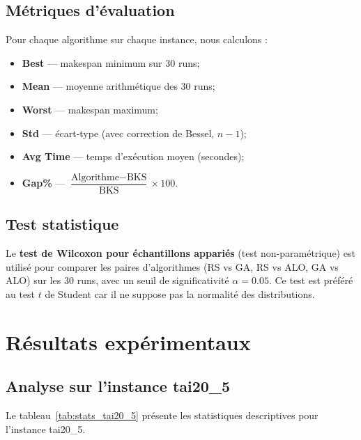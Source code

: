 \documentclass[12pt,a4paper,twoside]{report}
\begin{document}
\section{Métriques d'évaluation}

Pour chaque algorithme sur chaque instance, nous calculons :
\begin{itemize}
    \item \textbf{Best} --- makespan minimum sur 30 runs;
    \item \textbf{Mean} --- moyenne arithmétique des 30 runs;
    \item \textbf{Worst} --- makespan maximum;
    \item \textbf{Std} --- écart-type (avec correction de Bessel, $n-1$);
    \item \textbf{Avg Time} --- temps d'exécution moyen (secondes);
    \item \textbf{Gap\%} --- $\dfrac{\text{Algorithme} - \text{BKS}}{\text{BKS}} \times 100$.
\end{itemize}

\section{Test statistique}

Le \textbf{test de Wilcoxon pour échantillons appariés} (test non-paramétrique) est utilisé pour comparer les paires d'algorithmes (RS vs GA, RS vs ALO, GA vs ALO) sur les 30 runs, avec un seuil de significativité $\alpha = 0.05$. Ce test est préféré au test $t$ de Student car il ne suppose pas la normalité des distributions.

\chapter{Résultats expérimentaux}

\section{Analyse sur l'instance tai20\_5}

Le tableau~\ref{tab:stats_tai20_5} présente les statistiques descriptives pour l'instance tai20\_5.
\end{document}
